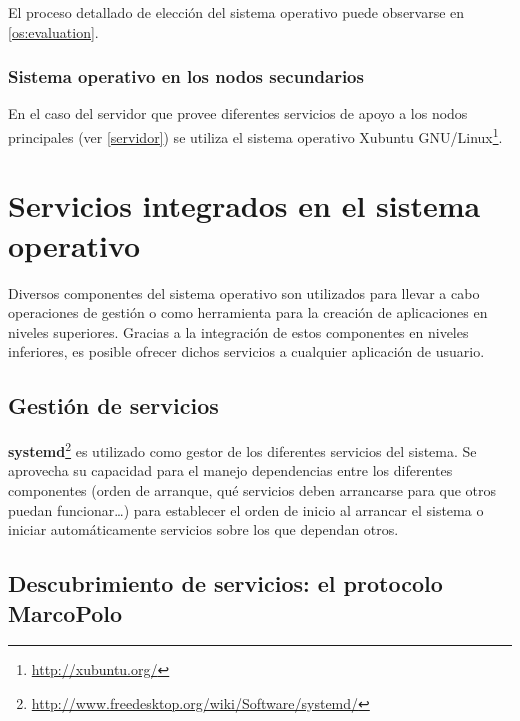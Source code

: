 
El proceso detallado de elección del sistema operativo puede observarse en \ref{os:evaluation}.
\subsubsection{Sistema operativo en los nodos secundarios}

En el caso del servidor que provee diferentes servicios de apoyo a los nodos principales (ver \ref{servidor}) se utiliza el sistema operativo Xubuntu GNU/Linux\footnote{\href{http://xubuntu.org/}{http://xubuntu.org/}}.%

\section{Servicios integrados en el sistema operativo}

Diversos componentes del sistema operativo son utilizados para llevar a cabo operaciones de gestión o como herramienta para la creación de aplicaciones en niveles superiores. Gracias a la integración de estos componentes en niveles inferiores, es posible ofrecer dichos servicios a cualquier aplicación de usuario. 

\subsection{Gestión de servicios}

\textbf{systemd}\footnote{\href{http://www.freedesktop.org/wiki/Software/systemd/}{http://www.freedesktop.org/wiki/Software/systemd/}} es utilizado como gestor de los diferentes servicios del sistema. Se aprovecha su capacidad para el manejo dependencias entre los diferentes componentes (orden de arranque, qué servicios deben arrancarse para que otros puedan funcionar\dots) para establecer el orden de inicio al arrancar el sistema o iniciar automáticamente servicios sobre los que dependan otros.


\subsection{Descubrimiento de servicios: el protocolo MarcoPolo}

